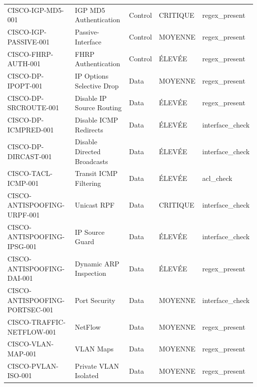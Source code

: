 \documentclass[12pt, a4paper]{report}
\begin{document}
\begin{longtable}{>{\small}p{3.8cm} >{\small}p{3cm} >{\small}p{2cm} >{\small}p{2cm} >{\small}p{2.5cm}}
  \rowcolor{tableRowA} CISCO-IGP-MD5-001 & IGP MD5 Authentication & Control & \textcolor{accentRed}{CRITIQUE} & regex\_present \\
  \rowcolor{tableRowB} CISCO-IGP-PASSIVE-001 & Passive-Interface & Control & \textcolor{accentGreen}{MOYENNE} & regex\_present \\
  \rowcolor{tableRowA} CISCO-FHRP-AUTH-001 & FHRP Authentication & Control & \textcolor{accentOrange}{ÉLEVÉE} & regex\_present \\
  \rowcolor{tableRowB} CISCO-DP-IPOPT-001 & IP Options Selective Drop & Data & \textcolor{accentGreen}{MOYENNE} & regex\_present \\
  \rowcolor{tableRowA} CISCO-DP-SRCROUTE-001 & Disable IP Source Routing & Data & \textcolor{accentOrange}{ÉLEVÉE} & regex\_present \\
  \rowcolor{tableRowB} CISCO-DP-ICMPRED-001 & Disable ICMP Redirects & Data & \textcolor{accentOrange}{ÉLEVÉE} & interface\_check \\
  \rowcolor{tableRowA} CISCO-DP-DIRCAST-001 & Disable Directed Broadcasts & Data & \textcolor{accentOrange}{ÉLEVÉE} & interface\_check \\
  \rowcolor{tableRowB} CISCO-TACL-ICMP-001 & Transit ICMP Filtering & Data & \textcolor{accentOrange}{ÉLEVÉE} & acl\_check \\
  \rowcolor{tableRowA} CISCO-ANTISPOOFING-URPF-001 & Unicast RPF & Data & \textcolor{accentRed}{CRITIQUE} & interface\_check \\
  \rowcolor{tableRowB} CISCO-ANTISPOOFING-IPSG-001 & IP Source Guard & Data & \textcolor{accentOrange}{ÉLEVÉE} & interface\_check \\
  \rowcolor{tableRowA} CISCO-ANTISPOOFING-DAI-001 & Dynamic ARP Inspection & Data & \textcolor{accentOrange}{ÉLEVÉE} & regex\_present \\
  \rowcolor{tableRowB} CISCO-ANTISPOOFING-PORTSEC-001 & Port Security & Data & \textcolor{accentGreen}{MOYENNE} & interface\_check \\
  \rowcolor{tableRowA} CISCO-TRAFFIC-NETFLOW-001 & NetFlow & Data & \textcolor{accentGreen}{MOYENNE} & regex\_present \\
  \rowcolor{tableRowB} CISCO-VLAN-MAP-001 & VLAN Maps & Data & \textcolor{accentGreen}{MOYENNE} & regex\_present \\
  \rowcolor{tableRowA} CISCO-PVLAN-ISO-001 & Private VLAN Isolated & Data & \textcolor{accentGreen}{MOYENNE} & regex\_present \\
\end{longtable}
\end{document}
